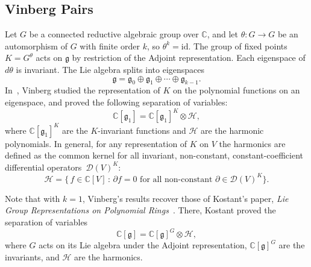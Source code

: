 \documentclass[11pt]{article}
\theoremstyle{definition}
\numberwithin{equation}{section}
\newcommand{\C}{\mathbb{C}}
\begin{document}
\subsection{Vinberg Pairs}
Let $G$ be a connected reductive algebraic group over $\C$, and let $\theta:G\to G$ be an automorphism of $G$ with finite order $k$, so $\theta^k = \text{id}$. The group of fixed points $K = G^\theta$ acts on $\mathfrak{g}$ by restriction of the Adjoint representation. Each eigenspace of $d\theta$ is invariant. The Lie algebra splits into eigenspaces
\begin{equation*}
    \mathfrak{g} = \mathfrak{g}_0 \oplus \mathfrak{g}_1 \oplus \cdots \oplus \mathfrak{g}_{k-1}.
\end{equation*}
In~\cite{Vinberg1976}, Vinberg studied the representation of $K$ on the polynomial functions on an eigenspace, and proved the following separation of variables:
\begin{equation*}
    \C[\mathfrak{g}_1] = \C[\mathfrak{g}_1]^K \otimes \mathcal{H},
\end{equation*}
where $\C[\mathfrak{g}_1]^K$ are the $K$-invariant functions and $\mathcal{H}$ are the harmonic polynomials. In general, for any representation of $K$ on $V$ the harmonics are defined as the common kernel for all invariant, non-constant, constant-coefficient differential operators~$\mathcal{D}(V)^K$:
\begin{equation*}
    \mathcal{H} = \{ \, f \in \C[V] \, : \, \partial f = 0 \text{ for all non-constant } \partial \in \mathcal{D}(V)^K \}.
\end{equation*}

Note that with $k=1$, Vinberg's results recover those of Kostant's paper, \textit{Lie Group Representations on Polynomial Rings}~\cite{Kostant1963}. There, Kostant proved the separation of variables
\begin{equation*}
    \C[\mathfrak{g}] = \C[\mathfrak{g}]^G \otimes \mathcal{H},
\end{equation*}
where $G$ acts on its Lie algebra under the Adjoint representation, $\C[\mathfrak{g}]^G$ are the invariants, and $\mathcal{H}$ are the harmonics. 
\end{document}
